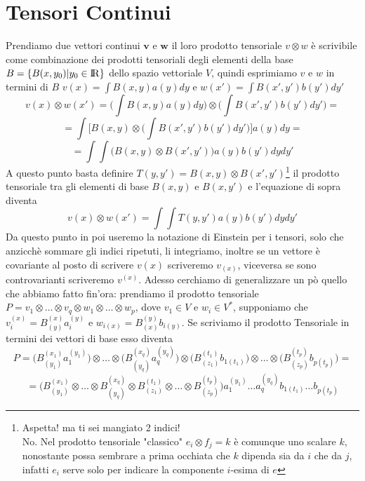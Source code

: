 \documentclass[11pt,a4paper]{report}
\newcommand{\vettore}[1]{\mathbf{#1}}
\theoremstyle{definition}
\theoremstyle{plain}
\theoremstyle{plain}
\begin{document}
		\section{Tensori Continui}
			Prendiamo due vettori continui $\vettore v$ e $\vettore w$ il loro prodotto tensoriale $v\otimes w$ è scrivibile come combinazione dei prodotti tensoriali degli elementi della base $B=\{B(x,y_0)|y_0\in \rm I\!R\}$ dello spazio vettoriale $V$, quindi esprimiamo $v$ e $w$ in termini di $B$ $v(x)=\int B(x,y)a(y)dy$ e $w(x')=\int B(x',y')b(y')dy'$
			\[
				v(x)\otimes w(x')=\bigg(\int B(x,y)a(y)dy \bigg)\otimes \bigg(\int B(x',y')b(y')dy'\bigg)=
			\]
			\[
				=\int \bigg[B(x,y)\otimes\bigg(\int B(x',y')b(y')dy'\bigg)\bigg]a(y)dy=
			\]
			\[
				=\int \int \bigg(B(x,y)\otimes B(x',y')\bigg)a(y)b(y')dydy'
			\]
			A questo punto basta definire $T(y,y')=B(x,y)\otimes B(x',y')$\footnote{Aspetta! ma ti sei mangiato 2 indici!\\ No. Nel prodotto tensoriale "classico" $e_i\otimes f_j=k$ è comunque uno scalare $k$, nonostante possa sembrare a prima occhiata che $k$ dipenda sia da $i$ che da $j$, infatti $e_i$ serve solo per indicare la componente $i$-esima di $e$} il prodotto tensoriale tra gli elementi di base $B(x,y)$ e $B(x,y')$ e l'equazione di sopra diventa
			\begin{equation}
				v(x)\otimes w(x')=\int \int T(y,y')a(y)b(y')dydy'
			\end{equation}
			Da questo punto in poi useremo la notazione di Einstein per i tensori, solo che anzicchè sommare gli indici ripetuti, li integriamo, inoltre se un vettore è covariante al posto di scrivere $v(x)$ scriveremo $v_{(x)}$, viceversa se sono controvarianti scriveremo $v^{(x)}$.\newline
			Adesso cerchiamo di generalizzare un pò quello che abbiamo fatto fin'ora: prendiamo il prodotto tensoriale $P=v_1\otimes\dots\otimes v_q\otimes w_1\otimes\dots\otimes w_p$, dove $v_1\in V$ e $w_i\in V^*$, supponiamo che $v_i^{(x)}=B^{(x)}_{(y)}a_i^{(y)}$ e $w_{i(x)}=B_{(x)}^{(y)}b_{i(y)}$.\newline
			Se scriviamo il prodotto Tensoriale in termini dei vettori di base esso diventa
			\[
				P=\Big(B^{(x_1)}_{(y_1)}a_1^{(y_1)}\Big)\otimes\dots\otimes\Big(B^{(x_q)}_{(y_q)}a_q^{(y_q)}\Big)\otimes\Big(B_{(z_1)}^{(t_1)}b_{1(t_1)}\Big)\otimes\dots\otimes\Big(B_{(z_p)}^{(t_p)}b_{p(t_p)}\Big)=
			\]
			\[
				=\Big(B^{(x_1)}_{(y_1)}\otimes\dots\otimes B^{(x_q)}_{(y_q)}\otimes B_{(z_1)}^{(t_1)}\otimes\dots\otimes B_{(z_p)}^{(t_p)}\Big)a_1^{(y_1)}\dots a_q^{(y_q)}b_{1(t_1)}\dots b_{p(t_p)}
			\]
\end{document}
